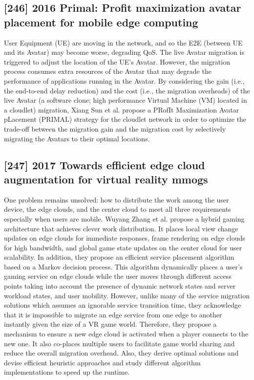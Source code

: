 \subsection{[246] 2016 Primal: Profit maximization avatar placement for mobile edge computing}
\label{subsec:paper15}
User Equipment (UE) are moving in the network, and so the E2E (between UE and its Avatar) may become worse, degrading QoS. The live Avatar migration is triggered to adjust the location of the UE’s Avatar. However, the migration process consumes extra resources of the Avatar that may degrade the performance of applications running in the Avatar. By considering the gain (i.e., the end-to-end delay reduction) and the cost (i.e., the migration overheads) of the live Avatar (a software clone; high performance Virtual Machine (VM) located in a cloudlet) migration, Xiang Sun et al. \cite{sun2016primal} propose a PRofIt Maximization Avatar pLacement (PRIMAL) strategy for the cloudlet network in order to optimize the trade-off between the migration gain and the migration cost by selectively migrating the Avatars to their optimal locations.

\subsection{[247] 2017 Towards efficient edge cloud augmentation for virtual reality mmogs}
\label{subsec:paper16}
One problem remains unsolved: how to distribute the work among the user device, the edge clouds, and the center cloud to meet all three requirements especially when users are mobile. Wuyang Zhang et al. \cite{zhang2017towards} propose a hybrid gaming architecture that achieves clever work distribution. It places local view change updates on edge clouds for immediate responses, frame rendering on edge clouds for high bandwidth, and global game state updates on the center cloud for user scalability. In addition, they propose an efficient service placement algorithm based on a Markov decision process. This algorithm dynamically places a user’s gaming service on edge clouds while the user moves through different access points taking into account the presence of dynamic network states and server workload states, and user mobility. However, unlike many of the service migration solutions which assumes an ignorable service transition time, they acknowledge that it is impossible to migrate an edge service from one edge to another instantly given the size of a VR game world. Therefore, they propose a mechanism to ensure a new edge cloud is activated when a player connects to the new one. It also co-places multiple users to facilitate game world sharing and reduce the overall migration overhead. Also, they derive optimal solutions and devise efficient heuristic approaches and study different algorithm implementations to speed up the runtime.

